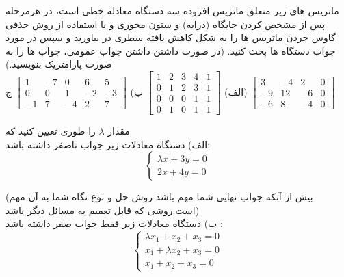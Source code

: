 \documentclass{article}
\begin{document}
\clearpage
{}  

ماتریس  های زیر متعلق ماتریس افزوده سه دستگاه معادله خطی است، در هرمرحله پس از مشخص  کردن جایگاه (درایه) و ستون محوری و با استفاده از روش حذفی گاوس جردن ماتریس ها را به شکل کاهش یافته سطری در بیاورید و سپس در مورد جواب دستگاه ها بحث کنید. (در صورت داشتن داشتن جواب عمومی، جواب ها را به صورت پارامتریک بنویسید.)
\\

الف)
${\begin{bmatrix}
	1&2&3&4&1\\
	0&1&2&3&1\\
	0&0&0&1&1\\
	0&1&0&1&1
	\end{bmatrix}}$
\qquad
ب)
$\begin{bmatrix}
1&-7&0&6&5\\
0&0&1&-2&-3\\
-1&7&-4&2&7
\end{bmatrix}
$
\qquad
ج)
$\begin{bmatrix}
3&-4&2&0\\
-9&12&-6&0\\
-6&8&-4&0
\end{bmatrix}$


مقدار 
$\lambda$
را طوری تعیین کنید که 
\\
الف) دستگاه معادلات زیر جواب ناصفر داشته باشد:
\begin{equation*}
\left\{
\begin{array}{rl}
\lambda x+3y=0\\
2x+4y=0
\end{array} \right.
\end{equation*}

(بیش از آنکه جواب نهایی شما مهم باشد روش حل و نوع نگاه شما به آن مهم است.روشی که قابل تعمیم به مسائل دیگر باشد)
\\

ب) دستگاه معادلات زیر فقط جواب صفر داشته باشد :
\begin{equation*}
\left\{
\begin{array}{rl}
\lambda x_1+x_2+x_3=0\\
x_1+\lambda x_2+x_3=0\\
x_1+x_2+x_3=0
\end{array} \right.
\end{equation*}

\end{document}
